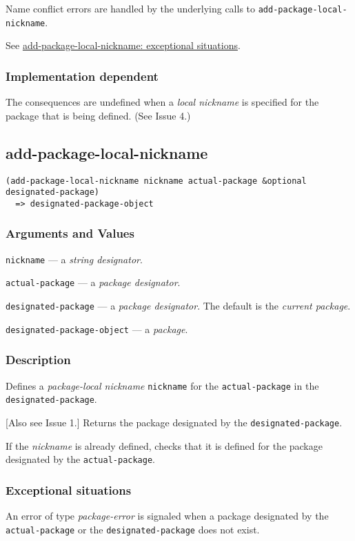 \documentclass[11pt]{article}
\begin{document}
Name conflict errors are handled by the underlying calls to
\texttt{add-package-local-nickname}.

See \hyperref[sec:orgdcd5ecd]{add-package-local-nickname: exceptional situations}.
\subsubsection{Implementation dependent}
\label{sec:org2696bbb}
The consequences are undefined when a \emph{local nickname} is specified for the
package that is being defined. (See Issue 4.)
\subsection{add-package-local-nickname}
\label{sec:orgceafe06}
\begin{verbatim}
(add-package-local-nickname nickname actual-package &optional designated-package)
  => designated-package-object
\end{verbatim}
\subsubsection{Arguments and Values}
\label{sec:orgb9143c0}
\texttt{nickname} --- a \emph{string designator}.

\texttt{actual-package} --- a \emph{package designator}.

\texttt{designated-package} --- a \emph{package designator}.
The default is the \emph{current package}.

\texttt{designated-package-object} --- a \emph{package}.
\subsubsection{Description}
\label{sec:org4a177ba}
Defines a \emph{package-local nickname} \texttt{nickname} for the \texttt{actual-package} in the
\texttt{designated-package}.

[Also see Issue 1.] Returns the package designated by the \texttt{designated-package}.

If the \emph{nickname} is already defined, checks that it is defined for the package
designated by the \texttt{actual-package}.
\subsubsection{Exceptional situations}
\label{sec:orgdcd5ecd}
An error of type \emph{package-error} is signaled when a package designated by the
\texttt{actual-package} or the \texttt{designated-package} does not exist.
\end{document}
